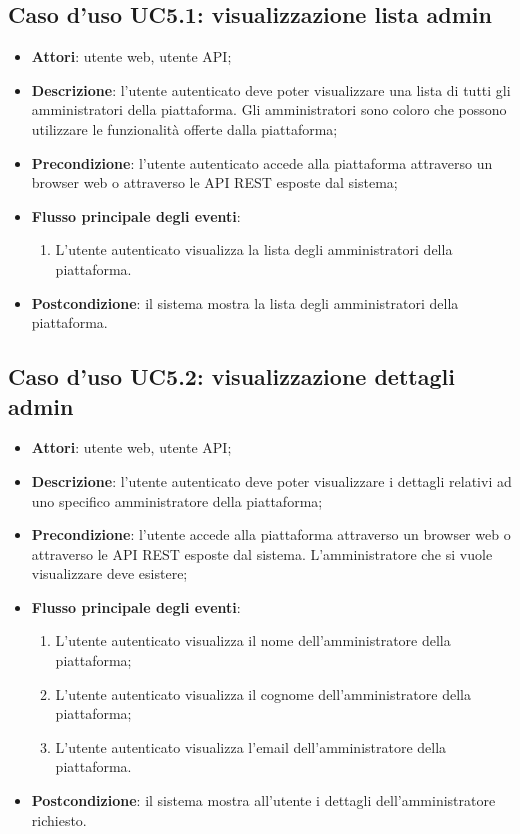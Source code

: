 \subsection{Caso d'uso UC5.1: visualizzazione lista admin}
\begin{itemize}
\item \textbf{Attori}: utente web, utente API;
\item \textbf{Descrizione}: l'utente autenticato deve poter visualizzare una lista di tutti gli amministratori della piattaforma. Gli amministratori sono coloro che possono utilizzare le funzionalità offerte dalla piattaforma; 
      \item \textbf{Precondizione}: l'utente autenticato accede alla piattaforma attraverso un browser web o attraverso le API REST esposte dal sistema;

        \item \textbf{Flusso principale degli eventi}:
          \begin{enumerate}
          \item L'utente autenticato visualizza la lista degli amministratori della piattaforma.

      \end{enumerate}
    \item \textbf{Postcondizione}: il sistema mostra la lista degli amministratori della piattaforma.
  \end{itemize}
\hypertarget{UC5.2}{}
\subsection{Caso d'uso UC5.2: visualizzazione dettagli admin}
\begin{itemize}
\item \textbf{Attori}: utente web, utente API;
\item \textbf{Descrizione}: l'utente autenticato deve poter visualizzare i dettagli relativi ad uno specifico amministratore della piattaforma; 
      \item \textbf{Precondizione}: l'utente accede alla piattaforma attraverso un browser web o attraverso le API REST esposte dal sistema. L'amministratore che si vuole visualizzare deve esistere;

        \item \textbf{Flusso principale degli eventi}:
          \begin{enumerate}
          \item L'utente autenticato visualizza il nome dell'amministratore della piattaforma;
          \item L'utente autenticato visualizza il cognome dell'amministratore della piattaforma;
          \item L'utente autenticato visualizza l'email dell'amministratore della piattaforma.

      \end{enumerate}
    \item \textbf{Postcondizione}: il sistema mostra all'utente i dettagli dell'amministratore richiesto.
  \end{itemize}
\hypertarget{UC5.3}{}
